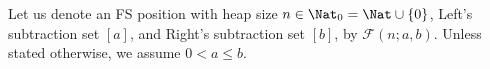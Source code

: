 \documentclass[oneside,reqno]{amsart}
\newcommand{\fs}{\mathcal{F}}
\begin{document}

        
        
        
        
        
        


Let us denote an {\sc FS} position with heap size $n\in \Nat_0= \Nat\cup\{0\} $, Left's subtraction set $[a]$, and Right's subtraction set $[b]$, by $\fs(n;a,b)$. Unless stated otherwise, we assume $0<a\le b$.  %

\end{document}

